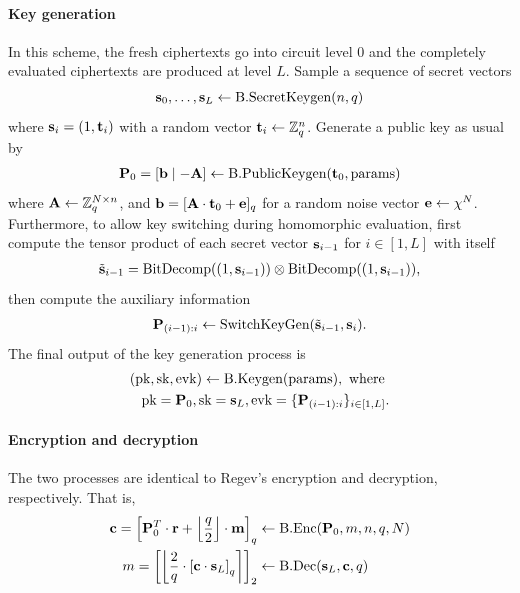 \documentclass[../main.tex]{subfiles}
\begin{document}
\paragraph{Key generation} In this scheme, the fresh ciphertexts go into circuit level 0 and the completely evaluated ciphertexts are produced at level $L$. Sample a sequence of secret vectors 
\[ \mathbf{s}_0, \dots, \mathbf{s}_L \leftarrow \text{B}.\text{SecretKeygen}(n,q) \] 
where $\mathbf{s}_i=(1,\mathbf{t}_i)$ with a random vector $\mathbf{t}_i \leftarrow \mathbb{Z}_q^n$. 
Generate a public key as usual by 
\begin{align*}
    \mathbf{P}_0=[\mathbf{b} \mid -\mathbf{A}] \leftarrow \text{B}.\text{PublicKeygen}(\mathbf{t}_0, \text{params}) 
\end{align*}
where $\mathbf{A} \leftarrow \mathbb{Z}_{q}^{N\times n}$, and $\mathbf{b} = [\mathbf{A} \cdot \mathbf{t}_0 + \mathbf{e}]_{q}$ for a random noise vector $\mathbf{e} \leftarrow \chi^N$.
Furthermore, to allow key switching during homomorphic evaluation, first compute the tensor product of each secret vector $\mathbf{s}_{i-1}$ for $i \in [1,L]$ with itself 
\begin{align*}
    \tilde{\mathbf{s}}_{i-1} = \text{BitDecomp}((1, \mathbf{s}_{i-1})) \otimes \text{BitDecomp}((1, \mathbf{s}_{i-1})),
\end{align*}
then compute the auxiliary information  
\begin{align*}
    \mathbf{P}_{(i-1):i} \leftarrow \text{SwitchKeyGen}(\tilde{\mathbf{s}}_{i-1}, \mathbf{s}_i).
\end{align*}
The final output of the key generation process is 
\begin{align*}
    (\text{pk}, \text{sk}, \text{evk}) \leftarrow \text{B}.\text{Keygen}(\text{params}), \text{ where }\\
    \text{pk} = \mathbf{P}_0, \text{sk}=\mathbf{s}_L, \text{evk}=\{\mathbf{P}_{(i-1):i}\}_{i \in [1,L]}.
\end{align*}

\paragraph{Encryption and decryption} The two processes are identical to Regev's encryption and decryption, respectively. That is, 
\begin{align*}
    \vc{c} =\sqbracket{\vc{P}_0^T \cdot \vc{r} + \floor{\frac{q}{2}} \cdot \vc{m}}_{q} &\leftarrow \brak.\enc(\vc{P}_0,m,n,q,N) \\ %
    m = \sqbracket{\round{\frac{2}{q} \cdot \sqbracket{\vc{c} \cdot \vc{s}_L}_{q}}}_2 &\leftarrow \brak.\dec(\vc{s}_L, \vc{c}, q) %
\end{align*}
\end{document}
